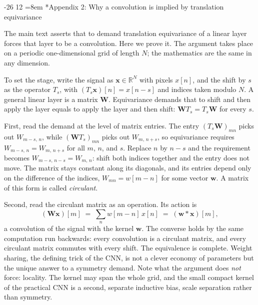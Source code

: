 \documentclass[graybox, envcountchap]{Template/svmult}
\makeatletter
\newif\ifarxiv
\renewcommand\section{\@startsection{section}{1}{\z@}%
                       {-26\p@}%
                       {12\p@}%
                       {\normalfont\secsize\secstyle
                        \rightskip=\z@ \@plus 8em\pretolerance=10000 }}
\newcommand{\printreferences}{\clearpage}
\makeatother
\begin{document}
\ifarxiv\printreferences\fi



\clearpage



\section*{Appendix 2: Why a convolution is implied by translation equivariance}
\label{app:conv-proof}

The main text asserts that to demand translation equivariance of a linear layer forces that layer to be a convolution. Here we prove it. The argument takes place on a periodic one-dimensional grid of length $N$; the mathematics are the same in any dimension.

To set the stage, write the signal as $\mathbf{x}\in\mathbb{R}^{N}$ with pixels $x[n]$, and the shift by $s$ as the operator $T_{s}$, with $(T_{s}\mathbf{x})[n]=x[n-s]$ and indices taken modulo $N$. A general linear layer is a matrix $\mathbf{W}$. Equivariance demands that to shift and then apply the layer equals to apply the layer and then shift: $\mathbf{W}T_{s}=T_{s}\mathbf{W}$ for every $s$.

First, read the demand at the level of matrix entries. The entry $(T_{s}\mathbf{W})_{mn}$ picks out $W_{m-s,\,n}$, while $(\mathbf{W}T_{s})_{mn}$ picks out $W_{m,\,n+s}$, so equivariance requires $W_{m-s,\,n}=W_{m,\,n+s}$ for all $m$, $n$, and $s$. Replace $n$ by $n-s$ and the requirement becomes $W_{m-s,\,n-s}=W_{m,\,n}$: shift both indices together and the entry does not move. The matrix stays constant along its diagonals, and its entries depend only on the difference of the indices, $W_{mn}=w[m-n]$ for some vector $\mathbf{w}$. A matrix of this form is called \emph{circulant}.

Second, read the circulant matrix as an operation. Its action is
\begin{equation}
(\mathbf{W}\mathbf{x})[m] \;=\; \sum_{n} w[m-n]\,x[n] \;=\; (\mathbf{w}\ast\mathbf{x})[m],
\end{equation}
a convolution of the signal with the kernel $\mathbf{w}$. The converse holds by the same computation run backwards: every convolution is a circulant matrix, and every circulant matrix commutes with every shift. The equivalence is complete. Weight sharing, the defining trick of the CNN, is not a clever economy of parameters but the unique answer to a symmetry demand. Note what the argument does \emph{not} force: locality. The kernel may span the whole grid, and the small compact kernel of the practical CNN is a second, separate inductive bias, scale separation rather than symmetry.
\end{document}
